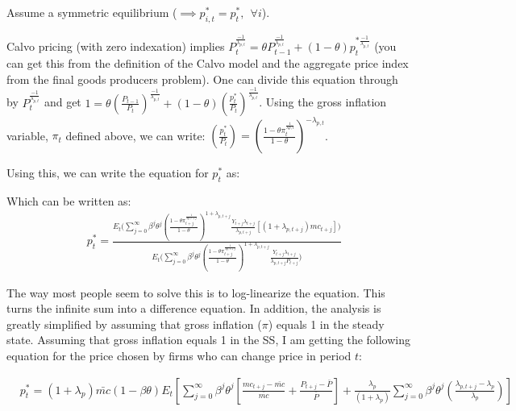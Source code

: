 \documentclass[article,11pt,letterpaper,fleqn]{article}
\theoremstyle{definition}
\numberwithin{equation}{section}
\begin{document}
Assume a symmetric equilibrium ($\implies p_{i,t}^{*}=p_{t}^{*}, \ \ \forall i$).

Calvo pricing (with zero indexation) implies $P_{t}^{\frac{-1}{\lambda_{p,t}}}= \theta P_{t-1}^{\frac{-1}{\lambda_{p,t}}} +(1-\theta)p_{t}^{*\frac{-1}{\lambda_{p,t}}}$ (you can get this from the definition of the Calvo model and the aggregate price index from the final goods producers problem).  One can divide this equation through by $P_{t}^{\frac{-1}{\lambda_{p,t}}}$ and get $1=\theta \left(\frac{P_{t-1}}{P_{t}}\right)^{\frac{-1}{\lambda_{p,t}}}+(1-\theta)\left(\frac{p_{t}^{*}}{P_{t}}\right)^{\frac{-1}{\lambda_{p,t}}}$.  Using the gross inflation variable, $\pi_{t}$ defined above, we can write: $\left(\frac{p_{t}^{*}}{P_{t}}\right)=\left(\frac{1-\theta\pi_{t}^{\frac{1}{\lambda{p,t}}}}{1-\theta} \right)^{-\lambda_{p,t}}$.

Using this, we can write the equation for $p_{t}^{*}$ as:

Which can be written as:
\begin{equation}
\begin{split}
 &   p_{t}^{*}=\frac{E_{t}\Biggl(\sum_{j=0}^{\infty}\beta^{j}\theta^{j} \left(\frac{1-\theta\pi_{t+j}^{\frac{1}{\lambda{p,t+j}}}}{1-\theta} \right)^{1+\lambda_{p,t+j}} \frac{Y_{t+j}\lambda_{t+j}}{\lambda_{p,t+j}} \left[(1+\lambda_{p,t+j})mc_{t+j}\right]\Biggr)}{E_{t}\Biggl(\sum_{j=0}^{\infty}\beta^{j}\theta^{j} \left(\frac{1-\theta\pi_{t+j}^{\frac{1}{\lambda{p,t+j}}}}{1-\theta} \right)^{1+\lambda_{p,t+j}}  \frac{Y_{t+j}\lambda_{t+j}}{\lambda_{p,t+j}P_{t+j}}\Biggr)}
\end{split}
\end{equation}

The way most people seem to solve this is to log-linearize the equation.  This turns the infinite sum into a difference equation.  In addition, the analysis is greatly simplified by assuming that gross inflation ($\pi$) equals 1 in the steady state.  Assuming that gross inflation equals 1 in the SS, I am getting the following equation for the price chosen by firms who can change price in period $t$:

\begin{equation}
\begin{split}
 &   p_{t}^{*}=(1+\lambda_{p})\bar{mc}(1-\beta\theta)E_{t}\left[\sum_{j=0}^{\infty}\beta^{j}\theta^{j}\left[\frac{mc_{t+j}-\bar{mc}}{\bar{mc}}+\frac{P_{t+j}-\bar{P}}{\bar{P}}\right]+\frac{\lambda_{p}}{(1+\lambda_{p})}\sum_{j=0}^{\infty}\beta^{j}\theta^{j}\left(\frac{\lambda_{p,t+j}-\lambda_{p}}{\lambda_{p}}\right)\right]
\end{split}
\end{equation}
\end{document}

